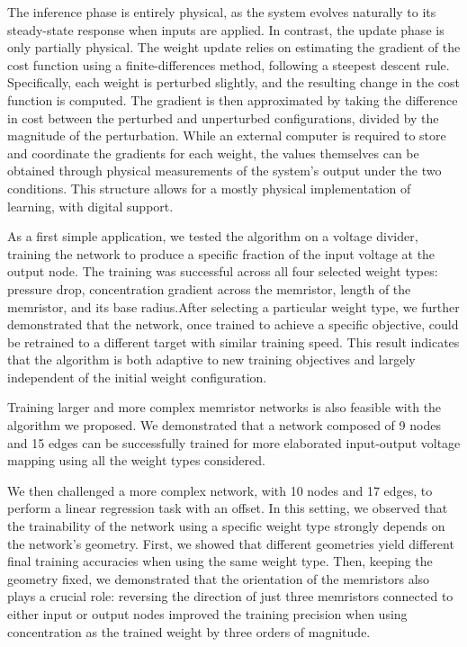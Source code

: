 \documentclass[reprint,superscriptaddress,prb,showkeys]{revtex4-2}
\begin{document}
The inference phase is entirely physical, as the system evolves naturally to its steady-state response when inputs are applied. In contrast, the update phase is only partially physical. The weight update relies on estimating the gradient of the cost function using a finite-differences method, following a steepest descent rule. Specifically, each weight is perturbed slightly, and the resulting change in the cost function is computed. The gradient is then approximated by taking the difference in cost between the perturbed and unperturbed configurations, divided by the magnitude of the perturbation. While an external computer is required to store and coordinate the gradients for each weight, the values themselves can be obtained through physical measurements of the system's output under the two conditions. This structure allows for a mostly physical implementation of learning, with digital support.

As a first simple application, we tested the algorithm on a voltage divider, training the network to produce a specific fraction of the input voltage at the output node. The training was successful across all four selected weight types: pressure drop, concentration gradient across the memristor, length of the memristor, and its base radius.After selecting a particular weight type, we further demonstrated that the network, once trained to achieve a specific objective, could be retrained to a different target with similar training speed. This result indicates that the algorithm is both adaptive to new training objectives and largely independent of the initial weight configuration.

Training larger and more complex memristor networks is also feasible with the algorithm we proposed. We demonstrated that a network composed of 9 nodes and 15 edges can be successfully trained for more elaborated input-output voltage mapping using all the weight types considered.

We then challenged a more complex network, with 10 nodes and 17 edges, to perform a linear regression task with an offset. In this setting, we observed that the trainability of the network using a specific weight type strongly depends on the network's geometry. First, we showed that different geometries yield different final training accuracies when using the same weight type. Then, keeping the geometry fixed, we demonstrated that the orientation of the memristors also plays a crucial role: reversing the direction of just three memristors connected to either input or output nodes improved the training precision when using concentration as the trained weight by three orders of magnitude.
\end{document}
